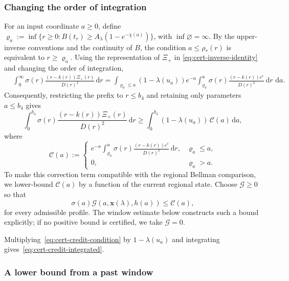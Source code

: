 \documentclass[11pt]{article}
\theoremstyle{definition}
\theoremstyle{remark}
\newcommand{\dd}{\,\mathrm d}
\begin{document}
\subsubsection{Changing the order of integration}

For an input coordinate $a\ge0$, define
$
 \varrho_a:=
 \inf\{r\ge0:
 B(t_r)\ge A_\lambda(1-e^{-\chi(a)})\}$,
with $\inf\varnothing=\infty$.
By the upper-inverse conventions and the continuity of $B$, the condition
$a\le\rho_*(r)$ is equivalent to $r\ge \varrho_a$.
Using the representation of $\Xi_+$ in
\eqref{eq:cert-inverse-identity} and changing the order of integration,
\begin{align}
 &\int_0^\infty
 \sigma(r)\frac{(r-k(r))\Xi_+(r)}{D(r)^2}\dd r =
 \int_{\varrho_a\le a}(1-\lambda(u_a))e^{-a}
 \int_{\varrho_a}^{a}
 \sigma(r)\frac{(r-k(r))e^r}{D(r)^2}\dd r\,\dd a.
 \label{eq:cert-tonelli-main}
\end{align}
Consequently, restricting the prefix to $r\le b_4$ and retaining only
parameters $a\le b_4$ gives
\[
 \int_0^{b_4}
 \sigma(r)\frac{(r-k(r))\Xi_+(r)}{D(r)^2}\dd r
 \ge
 \int_0^{b_4}
 (1-\lambda(u_a))\,\mathcal C(a)\dd a,
\]
where
\[
 \mathcal C(a):=
 \begin{cases}
 e^{-a}\displaystyle\int_{\varrho_a}^{a}
 \sigma(r)\frac{(r-k(r))e^r}{D(r)^2}\dd r,
 &\varrho_a\le a,\\[2mm]
 0,&\varrho_a>a.
 \end{cases}
\]
To make this correction term compatible with the regional Bellman comparison,
we lower-bound $\mathcal C(a)$ by a function of the current regional
state.  Choose $\mathcal G\ge0$ so that
\begin{equation}\label{eq:cert-credit-condition}
 \sigma(a)\mathcal G(a,\mathbf x(\lambda),h(a))
 \le \mathcal C(a),
\end{equation}
for every admissible profile.  The window estimate below
constructs such a bound explicitly; if no positive bound is certified,
we take $\mathcal G=0$.

Multiplying~\eqref{eq:cert-credit-condition} by $1-\lambda(u_a)$
and integrating gives~\eqref{eq:cert-credit-integrated}.

\subsubsection{A lower bound from a past window}
\end{document}
